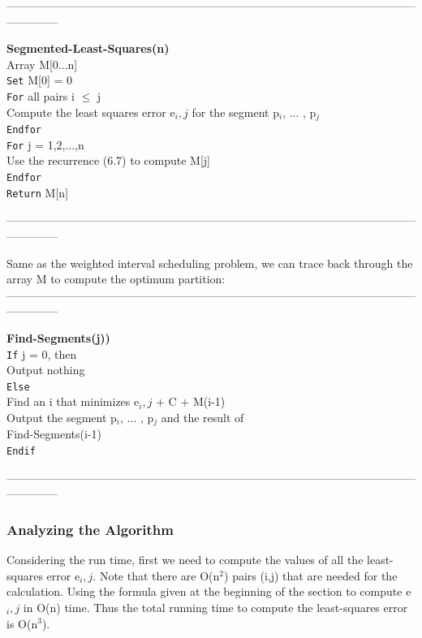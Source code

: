 \documentclass{article}
\begin{document}
\medskip
--------------------------------------------------------------------------------------------------------------------------
\medskip

\textbf{Segmented-Least-Squares(n)}\\
Array M[0...n]\\
\texttt{Set} M[0] = 0\\
\texttt{For} all pairs i $\le$ j\\
Compute the least squares error e$_i,j$ for the segment p$_i$, ... , p$_j$\\
\texttt{Endfor}\\
\texttt{For} j = 1,2,...,n \\
Use the recurrence (6.7) to compute M[j]\\
\texttt{Endfor}\\
\texttt{Return} M[n]


 
\medskip
--------------------------------------------------------------------------------------------------------------------------
\medskip

Same as the weighted interval scheduling problem, we can trace back through the array M to compute the optimum partition:\\

\medskip
--------------------------------------------------------------------------------------------------------------------------
\medskip

\textbf{Find-Segments(j))}\\
\texttt{If} j = 0, then\\
Output nothing\\
\texttt{Else}\\
Find an i that minimizes e$_i,j$ + C + M(i-1)\\
Output the segment {p$_i$, ... , p$_j$} and the result of\\
Find-Segments(i-1)\\
\texttt{Endif}

 
\medskip
--------------------------------------------------------------------------------------------------------------------------
\medskip

\subsubsection{Analyzing the Algorithm}
Considering the run time, first we need to compute the values of all the least-squares error e$_i,j$. Note that there are O(n$^2$) pairs (i,j) that are needed for the calculation. Using the formula given at the beginning of the section to compute e$_i,j$ in O(n) time. Thus the total running time to compute the least-squares error is O(n$^3$).\\
\end{document}
